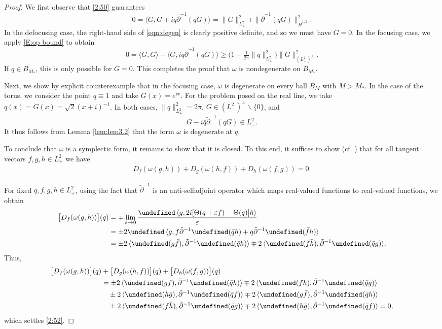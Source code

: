 \documentclass{amsart}
\numberwithin{equation}{section}
\theoremstyle{definition}
\newcommand{\om}{\omega}
\newcommand{\eps}{\varepsilon}
\newcommand{\f}{\frac}
\newcommand{\dd}{\partial}
\newcommand{\lan}{\langle}
\newcommand{\ran}{\rangle}
\let\Re=\undefined\DeclareMathOperator{\Re}{Re}
\begin{document}
\begin{proof}
We first observe that \eqref{2:50} guarantees 
\begin{equation}\label{eqn:degen}
0=\lan G, G\mp i\bar{q}\tilde{\dd}^{-1}(qG)\ran=\|G\|_{L^2_+}^2\mp\|\tilde{\dd}^{-1}(qG)\|_{\dot{H}^{1/2}}^2.
\end{equation}
In the defocusing case, the right-hand side of \eqref{eqn:degen} is clearly positive definite, and so we must have $G=0$. In the focusing case, we apply \eqref{E:op bound} to obtain
$$
0=\lan G,G\ran -\lan G,i\bar{q}\tilde{\dd}^{-1}(qG)\ran\geq\bigl(1-\tfrac1{2\pi}\|q\|_{L^2_+}^2\bigr)\|G\|_{(L^2_-)^{\perp}}^2.
$$
If $q\in B_{M_*}$, this is only possible for $G=0$.  This completes the proof that $\om$ is nondegenerate on $B_{M_\ast}$.

Next, we show by explicit counterexample that in the focusing case, $\om$ is degenerate on every ball $B_M$ with $M>M_\ast$. In the case of the torus, we consider the point $q\equiv1$ and take $G(x)=e^{ix}$.  For the problem posed on the real line, we take $q(x)=G(x) = \sqrt{2} (x+i)^{-1}$.  In both cases, $\|q\|^2_{L^2_+}=2\pi$, $G\in(L^2_-)^{\perp}\backslash\{0\}$, and
$$
G-i\bar{q}\tilde{\dd}^{-1}(qG)\in L^2_-.
$$
It thus follows from Lemma \ref{lem:lem3.2} that the form $\omega$ is degenerate at $q$.  

To conclude that $\om$ is a symplectic form, it remains to show that it is closed.  To this end, it suffices to show (cf. \cite{lang1995differential}) that for all tangent vectors $f,g,h\in L^2_+$ we have
\begin{align}\label{2:52}
D_f(\om(g,h))+D_g(\om(h,f))+D_h(\om(f,g))=0.
\end{align}

For fixed $q,f,g,h\in L^2_+$, using the fact that $\tilde{\dd}^{-1}$ is an anti-selfadjoint operator which maps real-valued functions to real-valued functions, we obtain
\begin{align*}
\bigl[D_f(\om(g,h))\bigr](q)
&=\mp\lim_{\eps\to0}\f{\Re\,\lan g,2i[\Theta(q+\eps f)-\Theta(q)]h\ran}{\eps}\\
&=\pm2\Re\,\lan g,f\tilde{\dd}^{-1}\Re(\bar{q}h)+q\tilde{\dd}^{-1}\Re(\bar{f}h)\ran\\
&=\pm2\,\lan\Re(g\bar{f}),\tilde{\dd}^{-1}\Re(\bar{q}h)\ran \mp 2\,\lan\Re(f\bar{h}),\tilde{\dd}^{-1}\Re(\bar{q}g)\ran.
\end{align*}
Thus,
\begin{align*}
\bigl[D_f(\om(g,h))\bigr](q)&+\bigl[D_g(\om(h,f))\bigr](q)+\bigl[D_h(\om(f,g))\bigr](q)\nonumber\\
&=\pm2\,\lan\Re(g\bar{f}),\tilde{\dd}^{-1}\Re(\bar{q}h)\ran\mp2\,\lan\Re(f\bar{h}),\tilde{\dd}^{-1}\Re(\bar{q}g)\ran\\
&\quad\pm2\,\lan\Re(h\bar{g}),\tilde{\dd}^{-1}\Re(\bar{q}f)\ran\mp2\,\lan\Re(g\bar{f}),\tilde{\dd}^{-1}\Re(\bar{q}h)\ran \\
&\quad\pm2\,\lan\Re(f\bar{h}),\tilde{\dd}^{-1}\Re(\bar{q}g)\ran\mp2\,\lan\Re(h\bar{g}),\tilde{\dd}^{-1}\Re(\bar{q}f)\ran =0,
\end{align*}
which settles \eqref{2:52}.


\end{proof}
\end{document}
